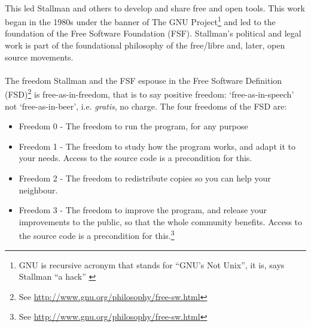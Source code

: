 \paragraph{}This led Stallman and others to develop and share free and open tools. This work began in the 1980s under the banner of The GNU Project\footnote{GNU is recursive acronym that stands for ``GNU's Not Unix'', it is, says Stallman ``a hack'' \cite[11m35sec]{moore:2002rv}} and led to the foundation of the Free Software Foundation (FSF).  Stallman's political and legal work is part of the foundational philosophy of the free/libre and, later, open source movements.

\paragraph{}The freedom Stallman and the FSF espouse in the Free Software Definition (FSD)\footnote{See \url{http://www.gnu.org/philosophy/free-sw.html}} is free-as-in-freedom, that is to say positive freedom: `free-as-in-speech' not `free-as-in-beer', i.e. \textit{gratis}, no charge. The four freedoms of the FSD are:

\begin{itemize}
\item Freedom 0 - The freedom to run the program, for any purpose
\item Freedom 1 - The freedom to study how the program works, and adapt it to your needs. Access to the source code is a precondition for this.
\item Freedom 2 - The freedom to redistribute copies so you can help your neighbour.
\item Freedom 3 - The freedom to improve the program, and release your improvements to the public, so that the whole community benefits. Access to the source code is a precondition for this.\footnote{See \url{http://www.gnu.org/philosophy/free-sw.html}}
\end{itemize}

